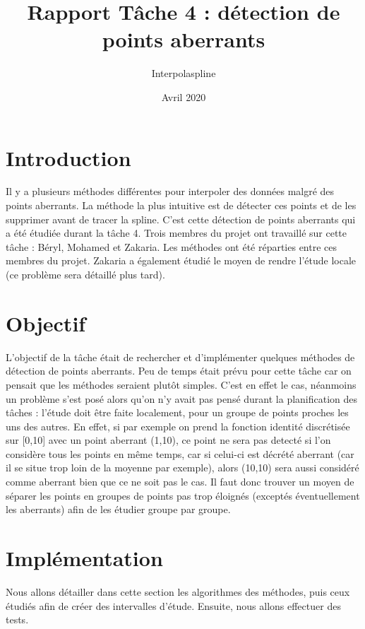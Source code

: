 \documentclass[a4paper,12pt]{article} %
\title{Rapport Tâche 4 : détection de points aberrants}
\author{Interpolaspline}
\date{Avril 2020}
\begin{document}
\maketitle

\section{Introduction}

Il y a plusieurs méthodes différentes pour interpoler des données malgré des points aberrants. La méthode la plus intuitive est de détecter ces points et de les supprimer avant de tracer la spline. C'est cette détection de points aberrants qui a été étudiée durant la tâche 4.
Trois membres du projet ont travaillé sur cette tâche : Béryl, Mohamed et Zakaria. Les méthodes ont été réparties entre ces membres du projet. Zakaria a également étudié le moyen de rendre l'étude locale (ce problème sera détaillé plus tard).

\section{Objectif}

L'objectif de la tâche était de rechercher et d'implémenter quelques méthodes de détection de points aberrants. Peu de temps était prévu pour cette tâche car on pensait que les méthodes seraient plutôt simples. C'est en effet le cas, néanmoins un problème s'est posé alors qu'on n'y avait pas pensé durant la planification des tâches : l'étude doit être faite localement, pour un groupe de points proches les uns des autres. En effet, si par exemple on prend la fonction identité discrétisée sur [0,10] avec un point aberrant (1,10), ce point ne sera pas detecté si l'on considère tous les points en même temps, car si celui-ci est décrété aberrant (car il se situe trop loin de la moyenne par exemple), alors (10,10) sera aussi considéré comme aberrant bien que ce ne soit pas le cas. Il faut donc trouver un moyen de séparer les points en groupes de points pas trop éloignés (exceptés éventuellement les aberrants) afin de les étudier groupe par groupe.

\section{Implémentation}
Nous allons détailler dans cette section les algorithmes des méthodes, puis ceux étudiés afin de créer des intervalles d'étude.
Ensuite, nous allons effectuer des tests.
\end{document}
